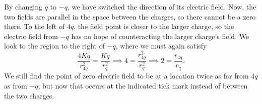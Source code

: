 \documentclass[]{article}
\begin{document}
By changing $ q $ to $ -q $, we have switched the direction of its electric field. Now, the two fields are parallel in the space between the charges, so there cannot be a zero there. To the left of $ 4q $, the field point is closer to the larger charge, so the electric field from $ -q $ has no hope of counteracting the larger charge's field. We look to the region to the right of $ -q $, where we must again satisfy
\[
\frac{4Kq}{r_{4q}^{2}} = \frac{Kq}{r_{q}^{2}} \implies 4 = \frac{r_{4q}^{2}}{r_{q}^{2}} \implies 2 = \frac{r_{4q}}{r_{q}}.
\]
We still find the point of zero electric field to be at a location twice as far from $ 4q $ as from $ -q $, but now that occurs at the indicated tick mark instead of between the two charges.
\end{document}
